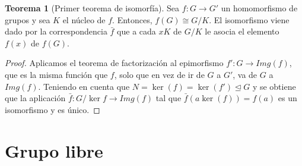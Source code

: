 \documentclass[12pt]{book}
\theoremstyle{definition}
\newtheorem{teor}{Teorema}[section]
\begin{document}
\begin{teor}[Primer teorema de isomorfía]
Sea $f:G\rightarrow G'$ un homomorfismo de grupos y sea $K$ el núcleo de $f$. Entonces, $f(G)\cong G/K$. El isomorfismo viene dado por la correspondencia $\bar{f}$ que a cada $xK$ de $G/K$ le asocia el elemento $f(x)$ de $f(G)$.
\end{teor}
\begin{proof}
Aplicamos el teorema de factorización al epimorfismo $f':G\rightarrow Img(f)$, que es la misma función que $f$, solo que en vez de ir de $G$ a $G'$, va de $G$ a $Img(f)$. Teniendo en cuenta que $N=\ker(f)=\ker(f')\unlhd G$ y se obtiene que la aplicación $\bar{f}:G/\ker{f}\rightarrow Img(f)$ tal que $\bar{f}(a\ker(f))=f(a)$ es un isomorfismo y es único.
\end{proof}

\section{Grupo libre}
\end{document}

